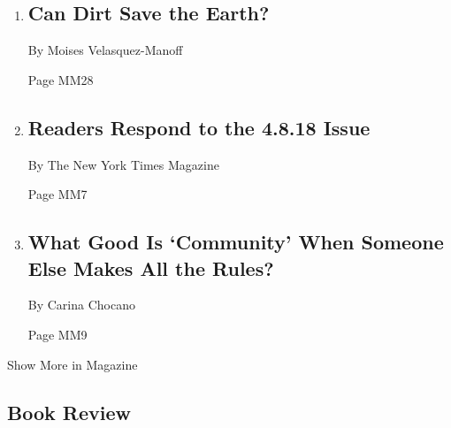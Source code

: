 \begin{enumerate}
\def\labelenumi{\arabic{enumi}.}
\item
  \href{/2018/04/18/magazine/dirt-save-earth-carbon-farming-climate-change.html}{}

  \hypertarget{can-dirt-save-the-earth}{%
  \subsection{Can Dirt Save the Earth?}\label{can-dirt-save-the-earth}}

  By Moises Velasquez-Manoff

  Page MM28
\item
  \href{/2018/04/18/magazine/readers-respond-to-the-4-818-issue.html}{}

  \hypertarget{readers-respond-to-the-4818-issue}{%
  \subsection{Readers Respond to the 4.8.18
  Issue}\label{readers-respond-to-the-4818-issue}}

  By The New York Times Magazine

  Page MM7
\item
  \href{/2018/04/17/magazine/what-good-is-community-when-someone-else-makes-all-the-rules.html}{}

  \hypertarget{what-good-is-community-when-someone-else-makes-all-the-rules}{%
  \subsection{What Good Is `Community' When Someone Else Makes All the
  Rules?}\label{what-good-is-community-when-someone-else-makes-all-the-rules}}

  By Carina Chocano

  Page MM9
\end{enumerate}

Show More in Magazine

\hypertarget{book-review}{%
\subsection{Book Review}\label{book-review}}

